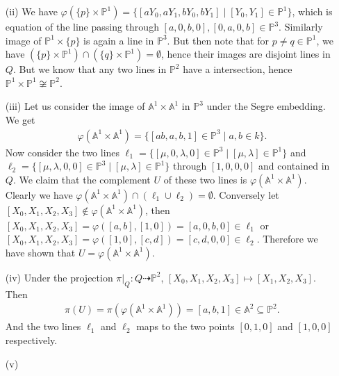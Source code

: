 \documentclass[12pt]{article}
\begin{document}
\begin{enumerate}
        \item[(ii)] We have $\varphi(\{p\} \times \mathbb{P}^1) = \{ [aY_0, aY_1, bY_0, bY_1] \mid [Y_0,Y_1] \in \mathbb{P}^1 \}$, which is equation of the line passing through $[a,0,b,0],[0,a,0,b] \in \mathbb{P}^3$. Similarly image of $\mathbb{P}^1 \times \{p\}$ is again a line in $\mathbb{P}^3$. But then note that for $p \neq q \in \mathbb{P}^1$, we have $(\{p\} \times \mathbb{P}^1) \cap (\{q\} \times \mathbb{P}^1) = \emptyset$, hence their images are disjoint lines in $Q$. But we know that any two lines in $\mathbb{P}^2$ have a intersection, hence $\mathbb{P}^1 \times \mathbb{P}^1 \not\cong \mathbb{P}^2$.
        
        \item[(iii)] Let us consider the image of $\mathbb{A}^1 \times \mathbb{A}^1$ in $\mathbb{P}^3$ under the Segre embedding. We get 
        \begin{align*}
            \varphi(\mathbb{A}^1 \times \mathbb{A}^1) = \{ [ab,a,b,1] \in \mathbb{P}^3 \mid a,b \in k \}.
        \end{align*}
        Now consider the two lines $\ell_1 = \{[\mu,0,\lambda,0] \in \mathbb{P}^3 \mid [\mu,\lambda] \in \mathbb{P}^1 \}$ and $\ell_2 = \{[\mu,\lambda,0,0] \in \mathbb{P}^3 \mid [\mu,\lambda] \in \mathbb{P}^1 \}$ through $[1,0,0,0]$ and contained in $Q$. We claim that the complement $U$ of these two lines is $\varphi(\mathbb{A}^1 \times \mathbb{A}^1)$. Clearly we have $\varphi(\mathbb{A}^1 \times \mathbb{A}^1) \cap (\ell_1 \cup \ell_2) = \emptyset$. Conversely let $[X_0,X_1,X_2,X_3] \notin \varphi(\mathbb{A}^1 \times \mathbb{A}^1)$, then $[X_0,X_1,X_2,X_3] = \varphi([a,b],[1,0]) = [a,0,b,0] \in \ell_1$ or $[X_0,X_1,X_2,X_3] = \varphi([1,0],[c,d]) = [c,d,0,0] \in \ell_2$. Therefore we have shown that $U = \varphi(\mathbb{A}^1 \times \mathbb{A}^1)$.
    
        \item[(iv)] Under the projection $\pi\vert_Q : Q \dashrightarrow \mathbb{P}^2$, $[X_0,X_1,X_2,X_3] \mapsto [X_1,X_2,X_3]$. Then 
        \begin{align*}
            \pi(U) = \pi(\varphi(\mathbb{A}^1 \times \mathbb{A}^1)) = [a,b,1] \in \mathbb{A}^2 \subseteq \mathbb{P}^2.
        \end{align*}
        And the two lines $\ell_1$ and $\ell_2$ maps to the two points $[0,1,0]$ and $[1,0,0]$ respectively. 
    
        \item[(v)]     
    \end{enumerate}
\end{document}
